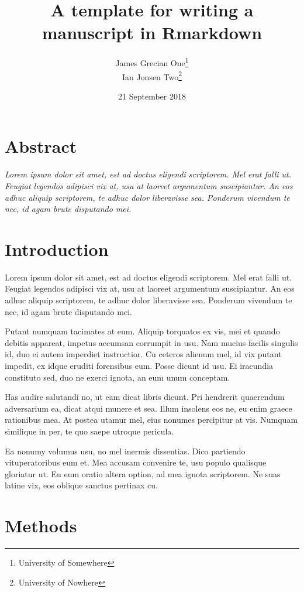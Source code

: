 \documentclass[]{article}
\title{A template for writing a manuscript in Rmarkdown}
\author{James Grecian One\footnote{University of Somewhere} \\ Ian Jonsen Two\footnote{University of Nowhere}}
\date{21 September 2018}
\begin{document}
\maketitle

\section{Abstract}\label{abstract}

\emph{Lorem ipsum dolor sit amet, est ad doctus eligendi scriptorem. Mel
erat falli ut. Feugiat legendos adipisci vix at, usu at laoreet
argumentum suscipiantur. An eos adhuc aliquip scriptorem, te adhuc dolor
liberavisse sea. Ponderum vivendum te nec, id agam brute disputando
mei.}

\section{Introduction}\label{introduction}

Lorem ipsum dolor sit amet, est ad doctus eligendi scriptorem. Mel erat
falli ut. Feugiat legendos adipisci vix at, usu at laoreet argumentum
suscipiantur. An eos adhuc aliquip scriptorem, te adhuc dolor
liberavisse sea. Ponderum vivendum te nec, id agam brute disputando mei.

Putant numquam tacimates at eum. Aliquip torquatos ex vis, mei et quando
debitis appareat, impetus accumsan corrumpit in usu. Nam mucius facilis
singulis id, duo ei autem imperdiet instructior. Cu ceteros alienum mel,
id vix putant impedit, ex idque eruditi forensibus eum. Posse dicunt id
usu. Ei iracundia constituto sed, duo ne exerci ignota, an eum unum
conceptam.

Has audire salutandi no, ut eam dicat libris dicunt. Pri hendrerit
quaerendum adversarium ea, dicat atqui munere et sea. Illum insolens eos
ne, eu enim graece rationibus mea. At postea utamur mel, eius nonumes
percipitur at vis. Numquam similique in per, te quo saepe utroque
pericula.

Ea nonumy volumus usu, no mel inermis dissentias. Dico partiendo
vituperatoribus eum et. Mea accusam convenire te, usu populo qualisque
gloriatur ut. Eu eum oratio altera option, ad mea ignota scriptorem. Ne
suas latine vix, eos oblique sanctus pertinax cu.

\section{Methods}\label{methods}
\end{document}
